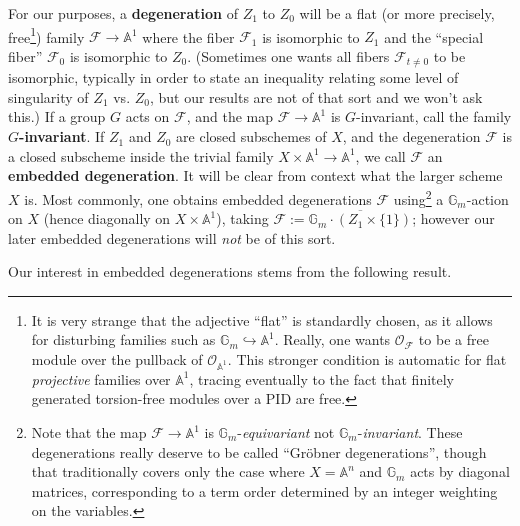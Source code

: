 \documentclass[11pt]{amsart}
\newtheorem{proposition}[Thm]{Proposition}
\theoremstyle{definition}
\newcommand\defn[1]{{\bf #1}}
\def\AA{{\mathbb A }}
\newcommand\calO{{\mathcal O}}
\newcommand\calF{{\mathcal F}}
\newcommand\Gm{{\mathbb G}_m}
\renewcommand\AA{{\mathbb A}}
\newcommand\into\hookrightarrow
\newcommand\junk[1]{}
\begin{document}
For our purposes, a \textbf{degeneration} of $Z_1$ to $Z_0$ will be a flat
(or more precisely, free\footnote{%
  It is very strange that the adjective ``flat'' is standardly chosen,
  as it allows for disturbing families such as $\Gm \into \AA^1$.
  Really, one wants $\calO_\calF$ to be a free module over the
  pullback of $\calO_{\AA^1}$. This stronger condition is automatic for
  flat {\em projective} families over $\AA^1$, tracing eventually to the fact that
  finitely generated torsion-free modules over a PID are free.})
family $\calF \to \mathbb{A}^1$ where the fiber
$\calF_1$ is isomorphic to $Z_1$ and the ``special fiber''
$\calF_0$ is isomorphic to $Z_0$. (Sometimes one wants all
fibers $\calF_{t\neq 0}$ to be isomorphic, typically in order to state
an inequality relating some level of singularity of $Z_1$ vs. $Z_0$,
but our results are not of that sort and we won't ask this.)
If a group $G$ acts on $\calF$, and the map $\calF\to\AA^1$ is $G$-invariant,
call the family \defn{$G$-invariant}.
If $Z_1$ and $Z_0$ are closed subschemes of $X$,
and the degeneration $\calF$ is a closed subscheme inside the trivial family
$X \times \AA^1 \to \AA^1$, we call $\calF$ an \defn{embedded degeneration}. It will be clear from context what the larger scheme $X$ is.
Most commonly, one obtains embedded degenerations $\calF$ using\footnote{%
  Note that the map $\calF \to \AA^1$ is $\Gm$-{\em equivariant} not
  $\Gm$-{\em invariant}. 
  These degenerations really deserve to be called ``Gr\"obner degenerations'',
  though that traditionally covers only the case where $X = \AA^n$
  and $\Gm$ acts by diagonal matrices, corresponding to a term order
  determined by an integer weighting on the variables.}
a $\Gm$-action on $X$ (hence diagonally on $X\times \AA^1$),
taking $\calF := \overline{\Gm\cdot (Z_1 \times \{1\})}$;
however our later embedded degenerations will {\em not} be of this sort.

Our interest in embedded degenerations stems from the following result.

\junk{
\begin{proposition}\label{prop:sameclass}
  Let $X$ be a projective scheme with two closed subschemes
  $Z_1$ and $Z_0$. If there is an embedded degeneration from $Z_1$ to $Z_0$,
  then
  \[[Z_1] = [Z_0] \quad \text{in $A_*(X)$ or $H_*(X)$}, \]
  and
  \[[\mathcal{O}_{Z_1}] = [\mathcal{O}_{Z_0}] \quad \text{in $K_0(X)$}.
    \qquad\qquad\quad
  \]
  If $\calF$ is a $G$-invariant degeneration, then the equalities hold also for
  the equivariant classes in $K^G_0(X),A_*^G(X),H_*^G(X)$.
\end{proposition}
}
\end{document}
